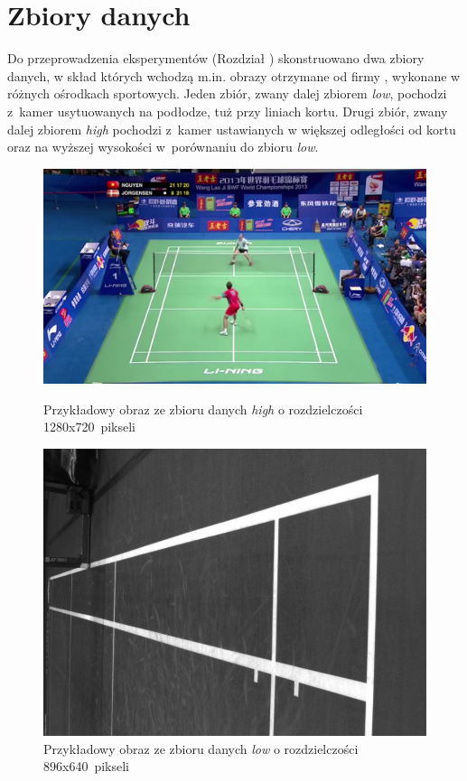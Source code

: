 \section{Zbiory danych}
\label{sec:zbiory}
Do przeprowadzenia eksperymentów (Rozdział ) skonstruowano dwa zbiory danych, w skład których wchodzą m.in. obrazy otrzymane od firmy \blue{}, wykonane w różnych ośrodkach sportowych.
Jeden zbiór, zwany dalej zbiorem \textit{low}, pochodzi z~kamer usytuowanych na podłodze, tuż przy liniach kortu.
Drugi zbiór, zwany dalej zbiorem \textit{high} pochodzi z~kamer ustawianych w większej odległości od kortu oraz na wyższej wysokości w~porównaniu do zbioru \textit{low}.


\begin{figure}[!htb]
    \includegraphics[width=\linewidth]{../../badminton/datasets/high/split/test_court2-00002.png}
    \caption{Przykładowy obraz ze zbioru danych \textit{high} o rozdzielczości 1280x720~pikseli}
  \endminipage\hfill
    \includegraphics[width=\linewidth]{../../badminton/datasets/low/split/1564909032792410075.jpg}
    \caption{Przykładowy obraz ze zbioru danych \textit{low} o rozdzielczości 896x640~pikseli}
  \endminipage\hfill
\end{figure}

